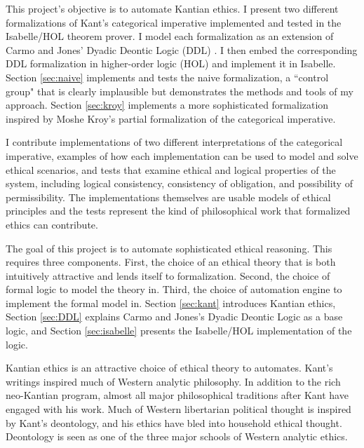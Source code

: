 \begin{isabellebody}
\begin{isamarkuptext}
This project's objective is to automate Kantian ethics. I present two different
formalizations of Kant's categorical imperative implemented and tested in the Isabelle/HOL \cite{isabelle} theorem prover.
I model each formalization  as an extension of Carmo and Jones' Dyadic Deontic Logic (DDL) \cite{CJDDL}. I then embed the corresponding 
DDL formalization in higher-order logic (HOL) and implement it in Isabelle. Section 
\ref{sec:naive} implements and tests the naive formalization, a ``control group" that is clearly implausible but 
demonstrates the methods and tools of my approach. Section \ref{sec:kroy} implements a more sophisticated 
formalization inspired by Moshe Kroy's partial formalization of the categorical imperative. 

I contribute implementations of two different interpretations of the categorical imperative, 
examples of how each implementation can be used to model and solve ethical scenarios, and tests that
examine ethical and logical properties of the system, including logical consistency, consistency
of obligation, and possibility of permissibility. The implementations themselves are usable models 
of ethical principles and the tests represent the kind of philosophical work that formalized ethics 
can contribute.%
\end{isamarkuptext}\isamarkuptrue%
%
\begin{isamarkuptext}%
The goal of this project is to automate sophisticated ethical reasoning. This requires three
components. First, the choice of an ethical theory that is both intuitively attractive and 
lends itself to formalization. Second, the choice of formal logic to model the theory in. Third, the 
choice of automation engine to implement the formal model in. Section \ref{sec:kant} introduces Kantian
ethics, Section \ref{sec:DDL} explains Carmo and Jones's Dyadic Deontic Logic \cite{CJDDL} as a 
base logic, and Section \ref{sec:isabelle} presents the Isabelle/HOL implementation of the logic.%
\end{isamarkuptext}\isamarkuptrue%
%
\isadelimdocument
%
\endisadelimdocument
%
\isatagdocument
%
\isamarkuptrue%
%
\endisatagdocument
{\isafolddocument}%
%
\isadelimdocument
%
\endisadelimdocument
%
\begin{isamarkuptext}%
Kantian ethics is an attractive choice of ethical theory to automates. Kant's writings inspired much of Western analytic philosophy. 
In addition to the rich neo-Kantian program, almost all major philosophical traditions after Kant have
engaged with his work. Much of Western libertarian political thought is inspired by Kant's deontology,
and his ethics have bled into household ethical thought. Deontology is seen as one of the three major 
schools of Western analytic ethics.


\end{isamarkuptext}
\end{isabellebody}
